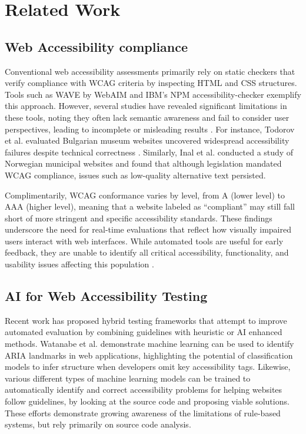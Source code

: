 
\section{Related Work}

\subsection{Web Accessibility compliance}

Conventional web accessibility assessments primarily rely on static checkers that verify compliance with \ac{WCAG} criteria by inspecting HTML and CSS structures. 
Tools such as WAVE by WebAIM\cite{webaim_wave_2025} and IBM's NPM accessibility-checker\cite{ibm_accessibility_checker_2025} exemplify this approach. %
However, several studies have revealed significant limitations in these tools, noting they often lack semantic awareness and fail to consider user perspectives, leading to incomplete or misleading results \cite{ara2024inclusive}. 
For instance, Todorov et al. evaluated Bulgarian museum websites uncovered widespread accessibility failures despite technical correctness \cite{todorov2022accessibility}. 
Similarly, Inal et al. conducted a study of Norwegian municipal websites and found that although legislation mandated \ac{WCAG} compliance, issues such as low-quality alternative text persisted\cite{inal2025does}.

Complimentarily, \ac{WCAG} conformance varies by level, from A (lower level) to AAA (higher level), meaning that a website labeled as “compliant” may still fall short of more stringent and specific accessibility standards. These findings underscore the need for real-time evaluations that reflect how visually impaired users interact with web interfaces. 
While automated tools are useful for early feedback, they are unable to identify all critical accessibility, functionality, and usability issues affecting this population \cite{todorov2022accessibility}.

\subsection{AI for Web Accessibility Testing}

Recent work has proposed hybrid testing frameworks that attempt to improve automated evaluation by combining guidelines with heuristic or \ac{AI} enhanced methods. Watanabe et al. \cite{watanabe2024accessibility} demonstrate machine learning can be used to identify ARIA landmarks in web applications, highlighting the potential of classification models to infer structure when developers omit key accessibility tags. 
Likewise, various different types of machine learning models can be trained to automatically identify and correct accessibility problems for helping websites follow guidelines, by looking at the source code and proposing viable solutions\cite{ramineni2024leveraging, kuszczynski2023comparative}. 
These efforts demonstrate growing awareness of the limitations of rule-based systems, but rely primarily on source code analysis.

